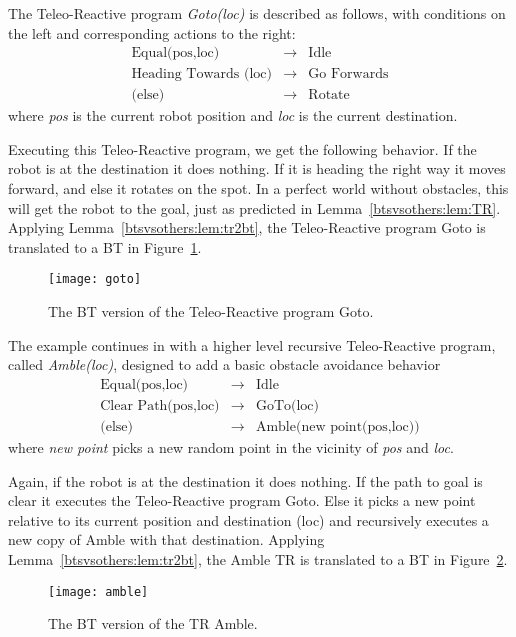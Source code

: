 \begin{example}
\label{btsvsothers:ex:goto}
 The Teleo-Reactive program \emph{Goto(loc)} is described as follows, with conditions on the left and corresponding actions to the right:
\begin{eqnarray}
 \mbox{Equal(pos,loc)} &\rightarrow& \mbox{Idle} \\
 \mbox{Heading Towards (loc)} &\rightarrow& \mbox{Go Forwards} \\
 \mbox{(else)} &\rightarrow& \mbox{Rotate} 
\end{eqnarray}
where \emph{pos} is the current robot position and \emph{loc} is the current destination.

Executing this Teleo-Reactive program, we get the following behavior. If the robot is at the destination it does nothing. If it is heading the right way it moves forward, 
and else it rotates on the spot. In a perfect world without obstacles, this will get the robot to the goal, just as predicted in Lemma~\ref{btsvsothers:lem:TR}.
Applying Lemma~\ref{btsvsothers:lem:tr2bt}, the Teleo-Reactive program Goto is translated to a BT in Figure~\ref{btsvsothers:fig:goto}.

\begin{figure}[htbp]
\begin{center}
\texttt{[image: goto]}
\caption{The BT version of the Teleo-Reactive program Goto. }
\label{btsvsothers:fig:goto}
\end{center}
\end{figure}

The example continues in  \cite{nilsson1994teleo} with 
 a higher level recursive Teleo-Reactive program, called \emph{Amble(loc)}, designed to add a basic obstacle avoidance behavior
\begin{eqnarray}
 \mbox{Equal(pos,loc)} &\rightarrow& \mbox{Idle} \\
 \mbox{Clear Path(pos,loc)} &\rightarrow& \mbox{GoTo(loc)} \\
 \mbox{(else)} &\rightarrow& \mbox{Amble(new point(pos,loc))} 
\end{eqnarray}
where \emph{new point} picks a new random point in the vicinity of \emph{pos} and \emph{loc}.

Again,
if the robot is at the destination it does nothing. If the path to goal is clear it executes the Teleo-Reactive program Goto. 
Else it picks a new point relative to its current position and destination (loc) and recursively executes a new copy of Amble with that destination.
Applying Lemma~\ref{btsvsothers:lem:tr2bt}, the Amble TR is translated to a BT in Figure~\ref{btsvsothers:fig:amble}.

\begin{figure}[htbp]
\begin{center}
\texttt{[image: amble]}
\caption{The BT version of the TR Amble. }
\label{btsvsothers:fig:amble}
\end{center}
\end{figure}

\end{example}

